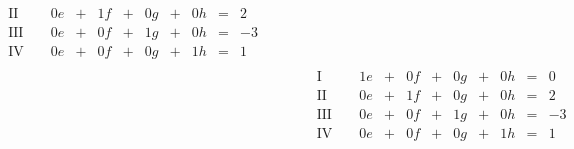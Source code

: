 \begin{exercise}
\begin{minipage}[t]{0.49\linewidth}
\begin{align*}
\begin{array}{r|rrrrrrrrrrrl}
         \text{II}{\,} & {\,} & \num{0}e & + & \num{1}f & + & \num{0}g & + & \num{0}h & = &  \num{2} & {\quad} &           \\
        \text{III}{\,} & {\,} & \num{0}e & + & \num{0}f & + & \num{1}g & + & \num{0}h & = & -\num{3} & {\quad} &           \\
         \text{IV}{\,} & {\,} & \num{0}e & + & \num{0}f & + & \num{0}g & + & \num{1}h & = &  \num{1} & {\quad} &
        \end{array}
        \\[1ex]&
        \begin{array}{r|rrrrrrrrrrrl}
          \text{I}{\,} & {\,} & \num{1}e & + & \num{0}f & + & \num{0}g & + & \num{0}h & = &  \num{0} & {\quad} &   \\
         \text{II}{\,} & {\,} & \num{0}e & + & \num{1}f & + & \num{0}g & + & \num{0}h & = &  \num{2} & {\quad} &   \\
        \text{III}{\,} & {\,} & \num{0}e & + & \num{0}f & + & \num{1}g & + & \num{0}h & = & -\num{3} & {\quad} &   \\
         \text{IV}{\,} & {\,} & \num{0}e & + & \num{0}f & + & \num{0}g & + & \num{1}h & = &  \num{1} & {\quad} &
        \end{array}
        \end{align*}
      \end{minipage}%
    \endgroup
  \fi
\end{exercise}
